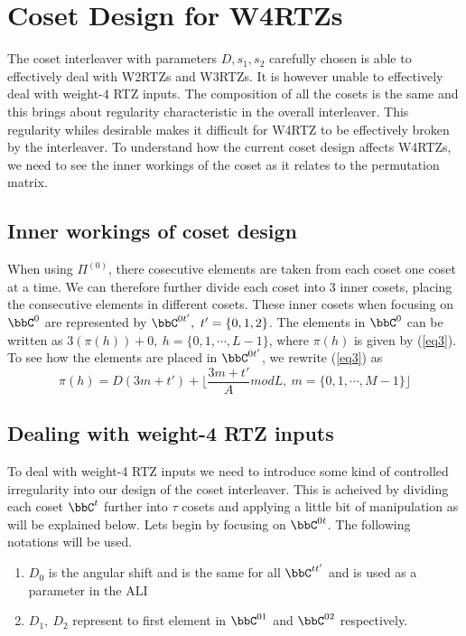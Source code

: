 \section{Coset Design for W4RTZs}
The coset interleaver with parameters $D,s_1,s_2$ carefully chosen is able to effectively deal with W2RTZs and W3RTZs. It is however unable to effectively deal with weight-$4$ RTZ inputs. The composition of all the cosets is the same and this brings about regularity characteristic in the overall interleaver. This regularity whiles desirable makes it difficult for W4RTZ to be effectively broken by the interleaver. To understand how the current coset design affects W4RTZs, we need to see the inner workings of the coset as it relates to the permutation matrix.

\subsection{Inner workings of coset design}
When using $\Pi^{(0)}$, there cosecutive elements are taken from each coset one coset at a time. We can therefore further divide each coset into 3 inner cosets, placing the consecutive elements in different cosets. These inner cosets when focusing on $\bbC^{0}$ are represented by $\bbC^{0t'},~t'=\{0,1,2\}$. The elements in $\bbC^{0}$ can be written as $3(\pi(h))+0,~h=\{0,1,\cdots,L-1\}$, where $\pi(h)$ is given by (\ref{eq3}). To see how the elements are placed in $\bbC^{0t'}$, we rewrite (\ref{eq3}) as 
\begin{equation}
\pi(h)=D(3m+t')+\lfloor\frac{3m+t'}{A} mod L,~m=\{0,1,\cdots,M-1\} \rfloor
\end{equation}


\subsection{Dealing with weight-4 RTZ inputs}
To deal with weight-4 RTZ inputs we need to introduce some kind of controlled irregularity into our design of the coset interleaver. This is acheived by dividing each coset $\bbC^t$ further into $\tau $ cosets and applying a little bit of manipulation as will be explained below. Lets begin by focusing on $\bbC^{0t}$. The following notations will be used.

\begin{enumerate}

\item $D_0$ is the angular shift and is the same for all $\bbC^{tt'}$ and is used as a parameter in the ALI

\item $D_1,~D_2$ represent to first element in $\bbC^{01}$ and $\bbC^{02}$ respectively.

\end{enumerate}

